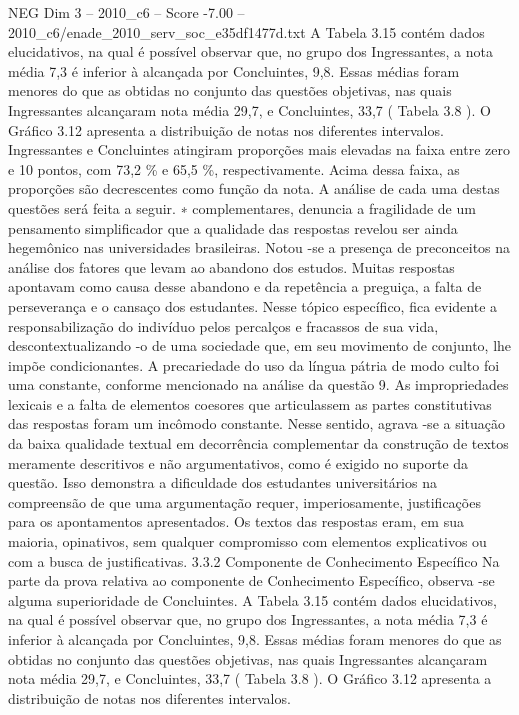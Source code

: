 \begin{textsample}{NEG Dim 3 – 2010\_c6 – Score -7.00 – 2010\_c6/enade\_2010\_serv\_soc\_e35df1477d.txt}
A Tabela 3.15 contém dados elucidativos, na qual é possível observar que, no grupo dos Ingressantes, a nota média 7,3 é inferior à alcançada por Concluintes, 9,8.
Essas médias foram menores do que as obtidas no conjunto das questões objetivas, nas quais Ingressantes alcançaram nota média 29,7, e Concluintes, 33,7 ( Tabela 3.8 ).
O Gráfico 3.12 apresenta a distribuição de notas nos diferentes intervalos.
Ingressantes e Concluintes atingiram proporções mais elevadas na faixa entre zero e 10 pontos, com 73,2 \% e 65,5 \%, respectivamente.
Acima dessa faixa, as proporções são decrescentes como função da nota.
A análise de cada uma destas questões será feita a seguir. ∗ complementares, denuncia a fragilidade de um pensamento simplificador que a qualidade das respostas revelou ser ainda hegemônico nas universidades brasileiras.
Notou -se a presença de preconceitos na análise dos fatores que levam ao abandono dos estudos.
Muitas respostas apontavam como causa desse abandono e da repetência a preguiça, a falta de perseverança e o cansaço dos estudantes.
Nesse tópico específico, fica evidente a responsabilização do indivíduo pelos percalços e fracassos de sua vida, descontextualizando -o de uma sociedade que, em seu movimento de conjunto, lhe impõe condicionantes.
A precariedade do uso da língua pátria de modo culto foi uma constante, conforme mencionado na análise da questão 9.
As impropriedades lexicais e a falta de elementos coesores que articulassem as partes constitutivas das respostas foram um incômodo constante.
Nesse sentido, agrava -se a situação da baixa qualidade textual em decorrência complementar da construção de textos meramente descritivos e não argumentativos, como é exigido no suporte da questão.
Isso demonstra a dificuldade dos estudantes universitários na compreensão de que uma argumentação requer, imperiosamente, justificações para os apontamentos apresentados.
Os textos das respostas eram, em sua maioria, opinativos, sem qualquer compromisso com elementos explicativos ou com a busca de justificativas. 3.3.2 Componente de Conhecimento Específico Na parte da prova relativa ao componente de Conhecimento Específico, observa -se alguma superioridade de Concluintes.
A Tabela 3.15 contém dados elucidativos, na qual é possível observar que, no grupo dos Ingressantes, a nota média 7,3 é inferior à alcançada por Concluintes, 9,8.
Essas médias foram menores do que as obtidas no conjunto das questões objetivas, nas quais Ingressantes alcançaram nota média 29,7, e Concluintes, 33,7 ( Tabela 3.8 ).
O Gráfico 3.12 apresenta a distribuição de notas nos diferentes intervalos.

\end{textsample}
